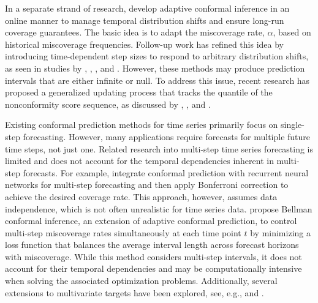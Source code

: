 \documentclass[
  11pt,
  a4paper,
]{article}
\theoremstyle{plain}
\theoremstyle{remark}
\begin{document}
In a separate strand of research, \textcite{gibbs2021} develop adaptive
conformal inference in an online manner to manage temporal distribution
shifts and ensure long-run coverage guarantees. The basic idea is to
adapt the miscoverage rate, \(\alpha\), based on historical miscoverage
frequencies. Follow-up work has refined this idea by introducing
time-dependent step sizes to respond to arbitrary distribution shifts,
as seen in studies by \textcite{bastani2022}, \textcite{zaffran2022},
\textcite{gibbs2024}, and \textcite{angelopoulos2024online}. However,
these methods may produce prediction intervals that are either infinite
or null. To address this issue, recent research has proposed a
generalized updating process that tracks the quantile of the
nonconformity score sequence, as discussed by \textcite{bhatnagar2023},
\textcite{angelopoulos2024}, and \textcite{angelopoulos2024online}.

Existing conformal prediction methods for time series primarily focus on
single-step forecasting. However, many applications require forecasts
for multiple future time steps, not just one. Related research into
multi-step time series forecasting is limited and does not account for
the temporal dependencies inherent in multi-step forecasts. For example,
\textcite{stankeviciute2021} integrate conformal prediction with
recurrent neural networks for multi-step forecasting and then apply
Bonferroni correction to achieve the desired coverage rate. This
approach, however, assumes data independence, which is not often
unrealistic for time series data. \textcite{yang2024ts} propose Bellman
conformal inference, an extension of adaptive conformal prediction, to
control multi-step miscoverage rates simultaneously at each time point
\(t\) by minimizing a loss function that balances the average interval
length across forecast horizons with miscoverage. While this method
considers multi-step intervals, it does not account for their temporal
dependencies and may be computationally intensive when solving the
associated optimization problems. Additionally, several extensions to
multivariate targets have been explored, see, e.g.,
\textcite{schlembach2022} and \textcite{sun2022}.
\end{document}
